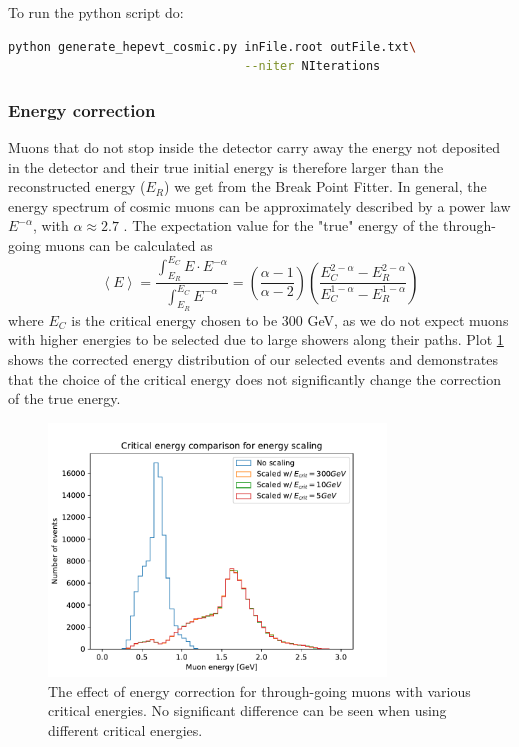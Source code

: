 \documentclass[12pt]{article}
\begin{document}
To run the python script do:
\begin{lstlisting}[frame=single,language=bash]
python generate_hepevt_cosmic.py inFile.root outFile.txt\
                                 --niter NIterations
\end{lstlisting}

\subsubsection{Energy correction}
Muons that do not stop inside the detector carry away the energy not deposited in the detector and their true initial energy is therefore larger than the reconstructed energy ($E_R$) we get from the Break Point Fitter. In general, the energy spectrum of cosmic muons can be approximately described by a power law $E^{-\alpha}$, with $\alpha\approx2.7$ \cite{NOVA-doc-51327-v3,rpp2022-rev-cosmic-rays.pdf}. The expectation value for the "true" energy of the through-going muons can be calculated as
\begin{equation}
\left\langle E\right\rangle =\frac{\int^{E_C}_{E_R} E\cdot E^{-\alpha}}{\int^{E_C}_{E_R} E^{-\alpha}}=\left(\frac{\alpha -1}{\alpha -2}\right)\left(\frac{E_C^{2-\alpha}-E_R^{2-\alpha}}{E_C^{1-\alpha}-E_R^{1-\alpha}}\right)
\end{equation}
where $E_C$ is the critical energy chosen to be 300 GeV, as we do not expect muons with higher energies to be selected due to large showers along their paths. Plot \ref{figEnergyScaling} shows the corrected energy distribution of our selected events and demonstrates that the choice of the critical energy does not significantly change the correction of the true energy. 

\begin{figure}[hbtp]
\centering
\includegraphics[width=0.8\textwidth]{ECritComparison.pdf}
\caption{The effect of energy correction for through-going muons with various critical energies. No significant difference can be seen when using different critical energies.}
\label{figEnergyScaling}
\end{figure}
\end{document}
